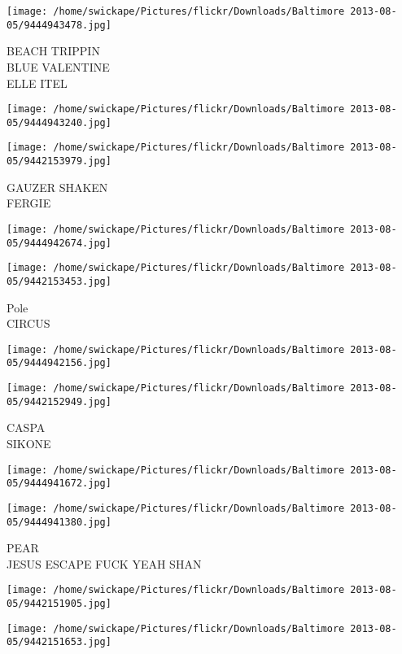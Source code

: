 \documentclass[10pt,letterpaper]{article}
\begin{document}
\vspace{0.25in}
\texttt{[image: /home/swickape/Pictures/flickr/Downloads/Baltimore 2013-08-05/9444943478.jpg]}

BEACH TRIPPIN\\
BLUE VALENTINE\\
ELLE ITEL
\pagebreak

\texttt{[image: /home/swickape/Pictures/flickr/Downloads/Baltimore 2013-08-05/9444943240.jpg]}

\vspace{0.25in}
\texttt{[image: /home/swickape/Pictures/flickr/Downloads/Baltimore 2013-08-05/9442153979.jpg]}

GAUZER SHAKEN\\
FERGIE
\pagebreak

\texttt{[image: /home/swickape/Pictures/flickr/Downloads/Baltimore 2013-08-05/9444942674.jpg]}

\vspace{0.25in}
\texttt{[image: /home/swickape/Pictures/flickr/Downloads/Baltimore 2013-08-05/9442153453.jpg]}

Pole\\
CIRCUS
\pagebreak

\texttt{[image: /home/swickape/Pictures/flickr/Downloads/Baltimore 2013-08-05/9444942156.jpg]}

\vspace{0.25in}
\texttt{[image: /home/swickape/Pictures/flickr/Downloads/Baltimore 2013-08-05/9442152949.jpg]}

CASPA\\
SIKONE
\pagebreak

\texttt{[image: /home/swickape/Pictures/flickr/Downloads/Baltimore 2013-08-05/9444941672.jpg]}

\vspace{0.25in}
\texttt{[image: /home/swickape/Pictures/flickr/Downloads/Baltimore 2013-08-05/9444941380.jpg]}

PEAR\\
JESUS ESCAPE FUCK YEAH SHAN
\pagebreak

\texttt{[image: /home/swickape/Pictures/flickr/Downloads/Baltimore 2013-08-05/9442151905.jpg]}

\vspace{0.25in}
\texttt{[image: /home/swickape/Pictures/flickr/Downloads/Baltimore 2013-08-05/9442151653.jpg]}
\end{document}
